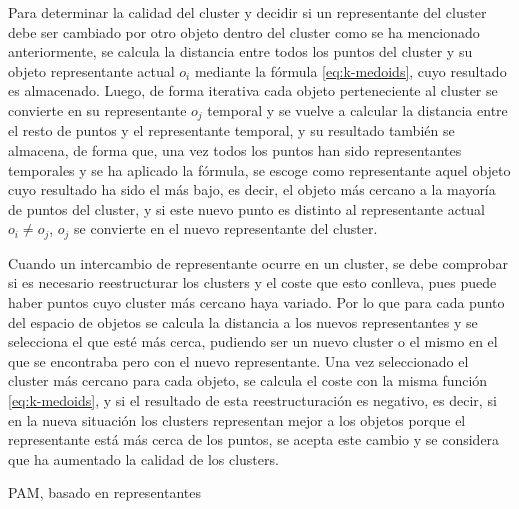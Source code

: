 \documentclass[10pt, a4paper]{article}
\begin{document}
Para determinar la calidad del cluster y decidir si un representante del cluster debe ser cambiado por otro objeto dentro del cluster como se ha mencionado anteriormente, se calcula la distancia entre todos los puntos del cluster y su objeto representante actual $o_i$ mediante la fórmula \ref{eq:k-medoids}, cuyo resultado es almacenado. Luego, de forma iterativa cada objeto perteneciente al cluster se convierte en su representante $o_j$ temporal y se vuelve a calcular la distancia entre el resto de puntos y el representante temporal, y su resultado también se almacena, de forma que, una vez todos los puntos han sido representantes temporales y se ha aplicado la fórmula, se escoge como representante aquel objeto cuyo resultado ha sido el más bajo, es decir, el objeto más cercano a la mayoría de puntos del cluster, y si este nuevo punto es distinto al representante actual $o_i \neq o_j$, $o_j$ se convierte en el nuevo representante del cluster. 

Cuando un intercambio de representante ocurre en un cluster, se debe comprobar si es necesario reestructurar los clusters y el coste que esto conlleva, pues puede haber puntos cuyo cluster más cercano haya variado. Por lo que para cada punto del espacio de objetos se calcula la distancia a los nuevos representantes y se selecciona el que esté más cerca, pudiendo ser un nuevo cluster o el mismo en el que se encontraba pero con el nuevo representante. Una vez seleccionado el cluster más cercano para cada objeto, se calcula el coste con la misma función \ref{eq:k-medoids}, y si el resultado de esta reestructuración es negativo, es decir, si en la nueva situación los clusters representan mejor a los objetos porque el representante está más cerca de los puntos, se acepta este cambio y se considera que ha aumentado la calidad de los clusters.

\begin{algorithm}[ht]
\SetAlgoLined
  \LinesNumbered
  \DontPrintSemicolon
  \caption{PAM, basado en representantes}
  \label{alg:Algoritmo PAM}
\end{algorithm}
\end{document}
